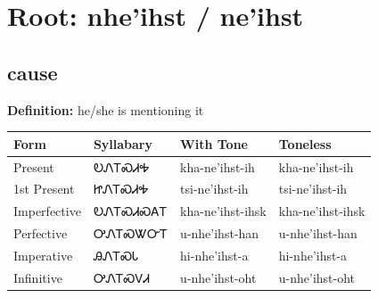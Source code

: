 \documentclass{article}%
\begin{document}
%
\normalsize%
\section*{Root: nhe'ihst / ne'ihst}%
\subsection*{cause}%
\textbf{Definition: }%
he/she is mentioning it%
\\[0.5em]%
\begin{tabular}{|l|l|l|l|}%
\hline%
\textbf{Form}&\textbf{Syllabary}&\textbf{With Tone}&\textbf{Toneless}\\%
\hline%
Present&ᎧᏁᎢᏍᏗᎭ&kha{-}ne'ihst{-}ih&kha{-}ne'ihst{-}ih\\%
1st Present&ᏥᏁᎢᏍᏗᎭ&tsi{-}ne'ihst{-}ih&tsi{-}ne'ihst{-}ih\\%
Imperfective&ᎧᏁᎢᏍᏗᏍᎪᎢ&kha{-}ne'ihst{-}ihsk&kha{-}ne'ihst{-}ihsk\\%
Perfective&ᎤᏁᎢᏍᏔᏅᎢ&u{-}nhe'ihst{-}han&u{-}nhe'ihst{-}han\\%
Imperative&ᎯᏁᎢᏍᏓ&hi{-}nhe'ihst{-}a&hi{-}nhe'ihst{-}a\\%
Infinitive&ᎤᏁᎢᏍᏙᏗ&u{-}nhe'ihst{-}oht&u{-}nhe'ihst{-}oht\\%
\hline%
\end{tabular}%
\\[1em]%
\end{document}
